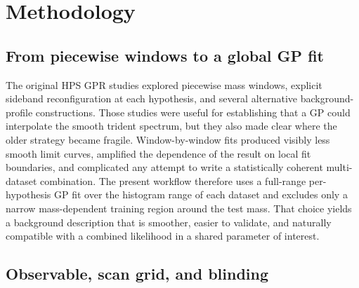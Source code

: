\section{Methodology}
\label{sec:methodology}

\subsection{From piecewise windows to a global GP fit}

The original HPS GPR studies explored piecewise mass windows, explicit sideband
reconfiguration at each hypothesis, and several alternative background-profile
constructions. Those studies were useful for establishing that a GP could interpolate
the smooth trident spectrum, but they also made clear where the older strategy became
fragile. Window-by-window fits produced visibly less smooth limit curves, amplified the
dependence of the result on local fit boundaries, and complicated any attempt to write
a statistically coherent multi-dataset combination. The present workflow therefore uses
a full-range per-hypothesis GP fit over the histogram range of each dataset and
excludes only a narrow mass-dependent training region around the test mass. That choice
yields a background description that is smoother, easier to validate, and naturally
compatible with a combined likelihood in a shared parameter of interest.

\subsection{Observable, scan grid, and blinding}

